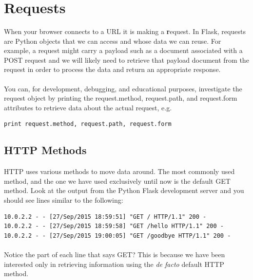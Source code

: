 \documentclass[12pt, a4paper, oneside]{book}
\begin{document}
\section{Requests}
\label{requests}
\paragraph{} When your browser connects to a URL it is making a {\textbf request}. In Flask, requests are Python objects that we can access and whose data we can reuse. For example, a request might carry a payload such as a document associated with a POST request and we will likely need to retrieve that payload document from the request in order to process the data and return an appropriate response.

\paragraph{} You can, for development, debugging, and educational purposes, investigate the request object by printing the request.method, request.path, and request.form attributes to retrieve data about the actual request, e.g.

\begin{lstlisting}
print request.method, request.path, request.form
\end{lstlisting}

\subsection{HTTP Methods}
\label{http-methods}
\paragraph{} HTTP uses various methods to move data around. The most commonly used method, and the one we have used exclusively until now is the default GET method. Look at the output from the Python Flask development server and you should see lines similar to the following:

\begin{lstlisting}[style=DOS]
10.0.2.2 - - [27/Sep/2015 18:59:51] "GET / HTTP/1.1" 200 -
10.0.2.2 - - [27/Sep/2015 18:59:58] "GET /hello HTTP/1.1" 200 -
10.0.2.2 - - [27/Sep/2015 19:00:05] "GET /goodbye HTTP/1.1" 200 -
\end{lstlisting}

\paragraph{} Notice the part of each line that says GET? This is because we have been interested only in retrieving information using the \emph{de facto} default HTTP method.
\end{document}
